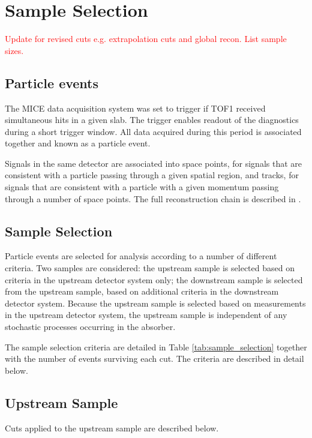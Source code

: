 \section{Sample Selection}
\label{Sect:Cuts-1}

\textcolor{red}{Update for revised cuts e.g. extrapolation cuts and global recon. List sample sizes.}

\subsection{Particle events}
The MICE data acquisition system was set to trigger if TOF1 received 
simultaneous hits in a given slab. The trigger enables readout of the 
diagnostics during a short trigger window. All data acquired during this period 
is associated together and known as a particle event. 

Signals in the same detector are associated into space points, for signals that 
are consistent with a particle passing through a given spatial region, and 
tracks, for signals that are consistent with a particle with a given momentum 
passing through a number of space points. The full reconstruction chain is
described in \cite{maus_paper}.

\subsection{Sample Selection}
Particle events are selected for analysis according to a number of different
criteria. Two samples are considered: the upstream sample is selected based on 
criteria in the upstream detector system only; the downstream sample is 
selected from the upstream sample, based on additional criteria in the 
downstream detector system. Because the upstream sample is selected based on
measurements in the upstream detector system, the upstream sample is 
independent of any stochastic processes occurring in the absorber.

The sample selection criteria are detailed in Table \ref{tab:sample_selection}
together with the number of events surviving each cut. The criteria are
described in detail below.



\subsection{Upstream Sample}
Cuts applied to the upstream sample are described below.

